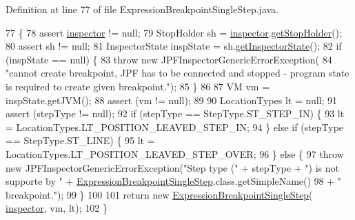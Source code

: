 Definition at line 77 of file Expression\+Breakpoint\+Single\+Step.\+java.


\begin{DoxyCode}
77                                                                                                            
                                                          \{
78     assert \hyperlink{classgov_1_1nasa_1_1jpf_1_1inspector_1_1server_1_1expression_1_1expressions_1_1_expression_breakpoint_single_step_ae63a59368500e841baaeafb3eea51ed1}{inspector} != null;
79     StopHolder sh = \hyperlink{classgov_1_1nasa_1_1jpf_1_1inspector_1_1server_1_1expression_1_1expressions_1_1_expression_breakpoint_single_step_ae63a59368500e841baaeafb3eea51ed1}{inspector}.\hyperlink{classgov_1_1nasa_1_1jpf_1_1inspector_1_1server_1_1jpf_1_1_j_p_f_inspector_ae952010e74e90389ddb3cef055a0d592}{getStopHolder}();
80     assert sh != null;
81     InspectorState inspState = sh.\hyperlink{classgov_1_1nasa_1_1jpf_1_1inspector_1_1server_1_1jpf_1_1_stop_holder_a1bad9bde4a6af463706584a73c3dd5e2}{getInspectorState}();
82     \textcolor{keywordflow}{if} (inspState == null) \{
83       \textcolor{keywordflow}{throw} \textcolor{keyword}{new} JPFInspectorGenericErrorException(
84           \textcolor{stringliteral}{"cannot create breakpoint, JPF has to be connected and stopped - program state is required to
       create given breakpoint."});
85     \}
86 
87     VM vm = inspState.getJVM();
88     assert (vm != null);
89 
90     LocationTypes lt = null;
91     assert (stepType != null);
92     \textcolor{keywordflow}{if} (stepType == StepType.ST\_STEP\_IN) \{
93       lt = LocationTypes.LT\_POSITION\_LEAVED\_STEP\_IN;
94     \} \textcolor{keywordflow}{else} \textcolor{keywordflow}{if} (stepType == StepType.ST\_LINE) \{
95       lt = LocationTypes.LT\_POSITION\_LEAVED\_STEP\_OVER;
96     \} \textcolor{keywordflow}{else} \{
97       \textcolor{keywordflow}{throw} \textcolor{keyword}{new} JPFInspectorGenericErrorException(\textcolor{stringliteral}{"Step type ("} + stepType + \textcolor{stringliteral}{") is not supporte by "} + 
      \hyperlink{classgov_1_1nasa_1_1jpf_1_1inspector_1_1server_1_1expression_1_1expressions_1_1_expression_breakpoint_single_step_a8f1d97213a51b7232d5f4cbd9c741797}{ExpressionBreakpointSingleStep}.class.getSimpleName()
98           + \textcolor{stringliteral}{" breakpoint."});
99     \}
100 
101     \textcolor{keywordflow}{return} \textcolor{keyword}{new} \hyperlink{classgov_1_1nasa_1_1jpf_1_1inspector_1_1server_1_1expression_1_1expressions_1_1_expression_breakpoint_single_step_a8f1d97213a51b7232d5f4cbd9c741797}{ExpressionBreakpointSingleStep}(
      \hyperlink{classgov_1_1nasa_1_1jpf_1_1inspector_1_1server_1_1expression_1_1expressions_1_1_expression_breakpoint_single_step_ae63a59368500e841baaeafb3eea51ed1}{inspector}, vm, lt);
102   \}
\end{DoxyCode}
